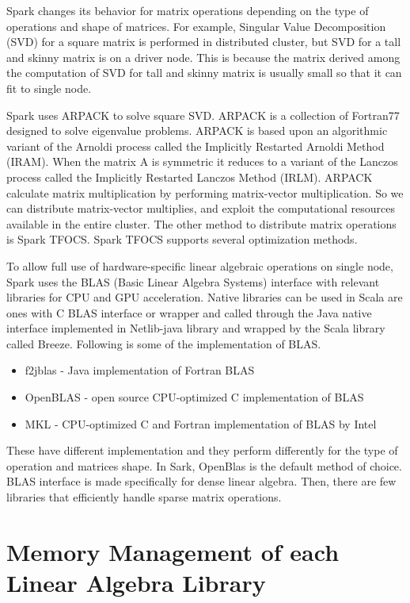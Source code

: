 Spark changes its behavior for matrix operations depending on the type of operations and shape of matrices. For example, Singular Value Decomposition (SVD) for a square matrix is performed in distributed cluster, 
but SVD for a tall and skinny matrix is on a driver node. This is because the matrix derived among the computation of SVD for tall and skinny matrix is usually small so that it can fit to single node.

Spark uses ARPACK to solve square SVD. ARPACK is a collection of Fortran77 designed to solve eigenvalue problems. ARPACK is based upon an algorithmic variant of the Arnoldi process called the Implicitly Restarted Arnoldi Method (IRAM). 
When the matrix A is symmetric it reduces to a variant of the Lanczos process called the Implicitly Restarted Lanczos Method (IRLM). 
ARPACK calculate matrix multiplication by performing matrix-vector multiplication. So we can distribute matrix-vector multiplies, and exploit the computational resources available in the entire cluster. 
The other method to distribute matrix operations is Spark TFOCS. Spark TFOCS supports several optimization methods.

To allow full use of hardware-specific linear algebraic operations on single node, Spark uses the BLAS (Basic Linear Algebra Systems) interface with relevant libraries for CPU and GPU acceleration. 
Native libraries can be used in Scala are ones with C BLAS interface or wrapper and called through the Java native interface implemented in Netlib-java library and wrapped by the Scala library called Breeze. 
Following is some of the implementation of BLAS.

\begin{itemize}
    \item f2jblas -  Java implementation of Fortran BLAS
    \item OpenBLAS - open source CPU-optimized C implementation of BLAS
    \item MKL - CPU-optimized C and Fortran implementation of BLAS by Intel
\end{itemize}

These have different implementation and they perform differently for the type of operation and matrices shape. 
In Sark, OpenBlas is the default method of choice. BLAS interface is made specifically for dense linear algebra. 
Then, there are few libraries that efficiently handle sparse matrix operations.

\section{Memory Management of each Linear Algebra Library}
\label{sec:history}

